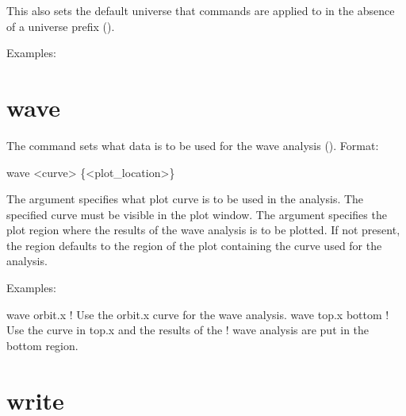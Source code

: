 {{{{This also sets the default universe that commands are applied to in
the absence of a universe prefix ().

Examples:

\section{wave}
\label{s:wave}

The  command sets what data is to be used for the wave
analysis (). Format:
\begin{example}
  wave <curve> \{<plot_location>\}
\end{example}

\vskip 0.1in

The  argument specifies what plot curve is to be used in
the analysis. The specified curve must be visible in the plot window.
The  argument specifies the plot region where the
results of the wave analysis is to be plotted. If not present, the
region defaults to the region of the plot containing the curve used
for the analysis.

Examples:
\begin{example}
  wave orbit.x      ! Use the orbit.x curve for the wave analysis.
  wave top.x bottom ! Use the curve in top.x and the results of the 
                    !  wave analysis are put in the bottom region.
\end{example}

\section{write}
\label{s:write}

}}}}
